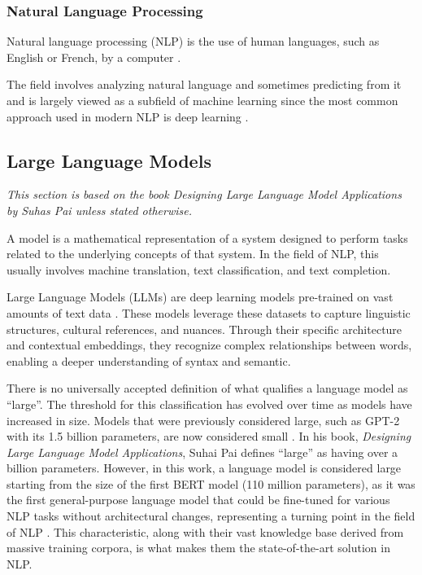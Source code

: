 \subsubsection{Natural Language Processing}

\begin{definition}
    Natural language processing (NLP) is the use of human languages, such as
English or French, by a computer \cite[p.461]{goodfellow2016deep}. 
\end{definition}

The field involves analyzing natural language and sometimes predicting from it \cite{goodfellow2016deep} and is largely viewed as a subfield of machine learning since the most common approach used in modern NLP is deep learning \cite[Preface, p. xi]{zhang2021natural}.

\subsection{Large Language Models}
\textit{This section is based on the book Designing Large Language Model Applications by Suhas Pai \cite{pai2025designing} unless stated otherwise.}

A model is a mathematical representation of a system designed to perform tasks related to the underlying concepts of that system. In the field of NLP, this usually involves machine translation, text classification, and text completion. 

Large Language Models (LLMs) are deep learning models pre-trained on vast amounts of text data \cite{AWS_LLM}. 
These models leverage these datasets to capture linguistic structures, cultural references, and nuances. Through their specific architecture and contextual embeddings, they recognize complex relationships between words, enabling a deeper understanding of syntax and semantic.

There is no universally accepted definition of what qualifies a language model as ``large''. The threshold for this classification has evolved over time as models have increased in size. Models that were previously considered large, such as GPT-2 with its 1.5 billion parameters, are now considered small \cite{vannguyen2024surveysmalllanguagemodels}. In his book, \textit{Designing Large Language Model Applications}, Suhai Pai defines ``large'' as having over a billion parameters. However, in this work, a language model is considered large starting from the size of the first BERT model (110 million parameters), as it was the first general-purpose language model that could be fine-tuned for various NLP tasks without architectural changes, representing a turning point in the field of NLP \cite{devlin2019bert}. This characteristic, along with their vast knowledge base derived from massive training corpora, is what makes them the state-of-the-art solution in NLP.

